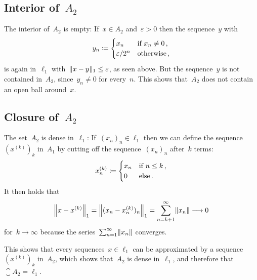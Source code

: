 \subsection*{Interior of~$A_2$}

The interior of~$A_2$ is empty:
If~$x \in A_2$ and~$\varepsilon > 0$ then the sequence~$y$ with
\[
            y_n
  \defined  \begin{cases}
              x_n             & \text{if~$x_n \neq 0$} \,,  \\
              \varepsilon/2^n & \text{otherwise} \,,
            \end{cases}
\]
is again in~$\ell_1$ with~$\norm{ x - y }_1 \leq \varepsilon$, as seen above.
But the sequence~$y$ is not contained in~$A_2$, since~$y_n \neq 0$ for every~$n$.
This shows that~$A_2$ does not contain an open ball around~$x$.





\subsection*{Closure of~$A_2$}

The set~$A_2$ is dense in~$\ell_1$:
If~$(x_n)_n \in \ell_1$ then we can define the sequence~$(x^{(k)})_k$ in~$A_1$ by cutting off the sequence~$(x_n)_n$ after~$k$ terms:
\[
            x^{(k)}_n
  \defined  \begin{cases}
              x_n & \text{if $n \leq k$} \,,  \\
              0   & \text{else} \,.
            \end{cases}
\]
It then holds that
\[
          \norm*{ x - x^{(k)} }_1
  =       \norm*{ (x_n - x^{(k)}_n)_n }_1
  =       \sum_{n={k+1}}^\infty \norm{x_n}
  \longto  0
\]
for~$k \to \infty$ because the series~$\sum_{n=1}^\infty \norm{x_n}$ converges.

This shows that every sequences~$x \in \ell_1$ can be approximated by a sequence~$(x^{(k)})_k$ in~$A_2$, which shows that~$A_2$ is dense in~$\ell_1$, and therefore that~$\closure{A_2} = \ell_1$.




